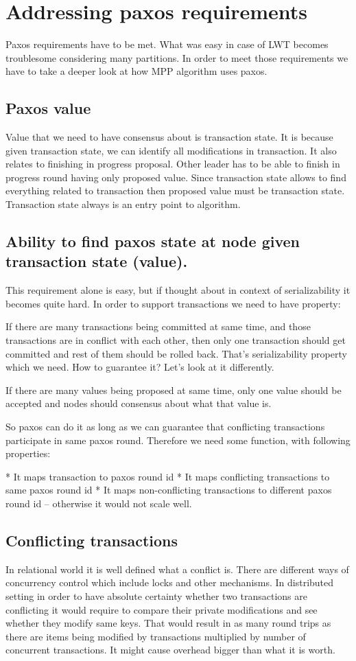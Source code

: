 \section{Addressing paxos requirements}
Paxos requirements have to be met. What was easy in case of LWT becomes troublesome considering many partitions. In order to meet those requirements we have to take a deeper look at how MPP algorithm uses paxos.


\subsection{Paxos value}
Value that we need to have consensus about is transaction state. It is because given transaction state, we can identify all modifications in transaction. It also relates to finishing in progress proposal. Other leader has to be able to finish in progress round having only proposed value. Since transaction state allows to find everything related to transaction then proposed value must be transaction state. Transaction state always is an entry point to algorithm.


\subsection{Ability to find paxos state at node given transaction state (value).}
This requirement alone is easy, but if thought about in context of serializability it becomes quite hard. In order to support transactions we need to have property:


If there are many transactions being committed at same time, and those transactions are in conflict with each other, then only one transaction should get committed and rest of them should be rolled back. 
That’s serializability property which we need. How to guarantee it? Let’s look at it differently.


If there are many values being proposed at same time, only one value should be accepted and nodes should consensus about what that value is.


So paxos can do it as long as we can guarantee that conflicting transactions participate in same paxos round. Therefore we need some function, with following properties:


* It maps transaction to paxos round id
* It maps conflicting transactions to same paxos round id 
* It maps non-conflicting transactions to different paxos round id -- otherwise it would not scale well.


\subsection{Conflicting transactions}
In relational world it is well defined what a conflict is. There are different ways of concurrency control which include locks and other mechanisms. In distributed setting in order to have absolute certainty whether two transactions are conflicting it would require to compare their private modifications and see whether they modify same keys. That would result in as many round trips as there are items being modified by transactions multiplied by number of concurrent transactions. It might cause overhead bigger than what it is worth. 


